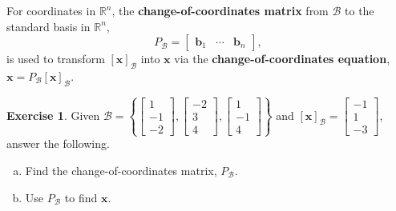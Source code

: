 \documentclass[10pt]{book}
\newcommand{\boxcolor}{gray!30}
\newenvironment{boxdef}{\begin{mdframed}[backgroundcolor=\boxcolor,linewidth=0pt,nobreak=true]}{\end{mdframed}}
\theoremstyle{definition}
\newtheorem{exercise}{Exercise}[section]
\newcommand{\R}{\mathbb{R}}
\newcommand{\B}{\mathscr{B}}
\newcommand{\vect}[1]{\ensuremath{\boldsymbol{\mathbf{#1}}}}
\newcommand{\vectB}[1][x]{[\vect{#1}]_\B}
\begin{document}
\begin{boxdef}
	For coordinates in $\R^n$, the \textbf{change-of-coordinates matrix} from $\B$ to the standard basis in $\R^n$, $$P_\B=\begin{bmatrix}\vect{b}_1&\cdots&\vect{b}_n\end{bmatrix},$$
	is used to transform $\vectB$ into $\vect{x}$ via the \textbf{change-of-coordinates equation}, $\vect{x}=P_\B\vectB$.
\end{boxdef}
\begin{exercise} %
	Given $\B=\left\{ \begin{bmatrix}1\\-1\\-2\end{bmatrix}, \begin{bmatrix}-2\\3\\4\end{bmatrix}, \begin{bmatrix}1\\-1\\4\end{bmatrix} \right\}$ and $\vectB=\begin{bmatrix}-1\\1\\-3\end{bmatrix}$, answer the following.
	\begin{multicols}{2}
		\begin{enumerate}[(a)]
			\item Find the change-of-coordinates matrix, $P_\B$.
			\item Use $P_\B$ to find $\vect{x}$.
		\end{enumerate}
	\end{multicols}
\end{exercise}
\vfill


\newpage
\end{document}
